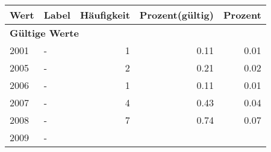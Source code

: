      \begin{longtable}{lXrrr}
     \toprule
     \textbf{Wert} & \textbf{Label} & \textbf{Häufigkeit} & \textbf{Prozent(gültig)} & \textbf{Prozent} \\
     \endhead
     \midrule
     \multicolumn{5}{l}{\textbf{Gültige Werte}}\\

     2001 &
     \multicolumn{1}{X}{ -  } &


       \num{1} &
       \num[round-mode=places,round-precision=2]{0,11} &
         \num[round-mode=places,round-precision=2]{0,01} \\

     2005 &
     \multicolumn{1}{X}{ -  } &


       \num{2} &
       \num[round-mode=places,round-precision=2]{0,21} &
         \num[round-mode=places,round-precision=2]{0,02} \\

     2006 &
     \multicolumn{1}{X}{ -  } &


       \num{1} &
       \num[round-mode=places,round-precision=2]{0,11} &
         \num[round-mode=places,round-precision=2]{0,01} \\

     2007 &
     \multicolumn{1}{X}{ -  } &


       \num{4} &
       \num[round-mode=places,round-precision=2]{0,43} &
         \num[round-mode=places,round-precision=2]{0,04} \\

     2008 &
     \multicolumn{1}{X}{ -  } &


       \num{7} &
       \num[round-mode=places,round-precision=2]{0,74} &
         \num[round-mode=places,round-precision=2]{0,07} \\

     2009 &
     \multicolumn{1}{X}{ -  } &



\end{longtable}
